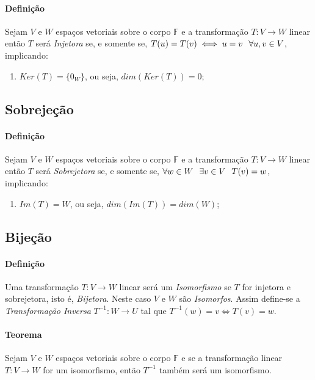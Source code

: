 \documentclass{article}
\begin{document}
            \paragraph{Definição}Sejam $V$ e $W$ espaços vetoriais sobre o corpo $\mathbb{F}$ e a transformação $T: V\rightarrow W$ linear então $T$ será \textit{Injetora} se, e somente se, $T(u) = T(v) \iff u = v \hspace{2.5mm} \forall u, v\in V$, implicando:
                \begin{enumerate}[noitemsep]
                    \item $Ker(T) = \{0_{W}\}$, ou seja, $dim(Ker(T)) = 0$;
                \end{enumerate}

        \subsection{Sobrejeção}
            \paragraph{Definição}Sejam $V$ e $W$ espaços vetoriais sobre o corpo $\mathbb{F}$ e a transformação $T: V\rightarrow W$ linear então $T$ será \textit{Sobrejetora} se, e somente se, $\forall w\in W \hspace{2.5mm} \exists v\in V \hspace{2.5mm} T(v) = w$, implicando:
                \begin{enumerate}[noitemsep]
                    \item $Im(T) = W$, ou seja, $dim(Im(T)) = dim(W)$;
                \end{enumerate}

        \subsection{Bijeção}
            \paragraph{Definição}Uma transformação $T: V \rightarrow W$ linear será um \textit{Isomorfismo} se $T$ for injetora e sobrejetora, isto é, \textit{Bijetora}. Neste caso $V$ e $W$ são \textit{Isomorfos}. Assim define-se a \textit{Transformação Inversa} $T^{-1}: W \rightarrow U$ tal que $T^{-1}(w) = v \iff T(v) = w$.

            \paragraph{Teorema}Sejam $V$ e $W$ espaços vetoriais sobre o corpo $\mathbb{F}$ e se a transformação linear $T: V \rightarrow W$ for um isomorfismo, então $T^{-1}$ também será um isomorfismo.
\end{document}
